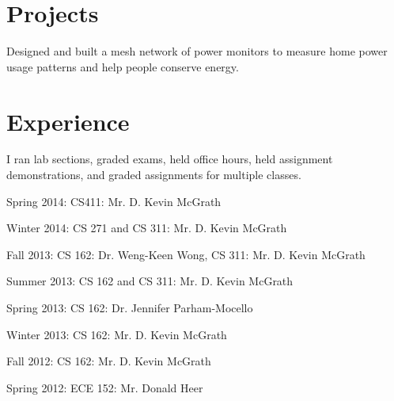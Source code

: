 \documentclass[letterpaper]{deedy-resume} %
\begin{document}
\hfill
%
%
\begin{minipage}[t]{0.66\textwidth} %


\section{Projects}


Designed and built a mesh network of power monitors to measure home power usage patterns and help people conserve energy.

\sectionspace %


\section{Experience}


I ran lab sections, graded exams, held office hours, held assignment demonstrations, and graded assignments for multiple classes.
\vspace{\topsep} %
\begin{tightitemize}
\item Spring 2014: CS411: Mr. D. Kevin McGrath
\item Winter 2014: CS 271 and CS 311: Mr. D. Kevin McGrath
\item Fall 2013: CS 162: Dr. Weng-Keen Wong, CS 311: Mr. D. Kevin McGrath
\item Summer 2013: CS 162 and CS 311: Mr. D. Kevin McGrath
\item Spring 2013: CS 162: Dr. Jennifer Parham-Mocello
\item Winter 2013: CS 162: Mr. D. Kevin McGrath
\item Fall 2012: CS 162: Mr. D. Kevin McGrath
\item Spring 2012: ECE 152: Mr. Donald Heer
\end{tightitemize}


\end{minipage}
\end{document}
